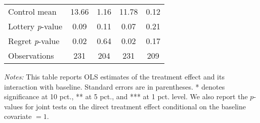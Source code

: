 \begin{table}[htbp]
{\begin{threeparttable}
\begin{tabular}{l*{4}{c}}
Control mean    &    13.66         &     1.16         &    11.78         &     0.12         \\
Lottery \emph{p}-value&     0.09         &     0.11         &     0.07         &     0.21         \\
Regret \emph{p}-value&     0.02         &     0.64         &     0.02         &     0.17         \\
Observations    &      231         &      204         &      231         &      209         \\
\bottomrule \end{tabular} \begin{tablenotes}[flushleft] \footnotesize \item \emph{Notes:} This table reports OLS estimates of the treatment effect and its interaction with baseline. Standard errors are in parentheses. * denotes significance at 10 pct., ** at 5 pct., and *** at 1 pct. level. We also report the \(p\)-values for joint tests on the direct treatment effect conditional on the baseline covariate $= 1$. \end{tablenotes} \end{threeparttable} } \end{table}
